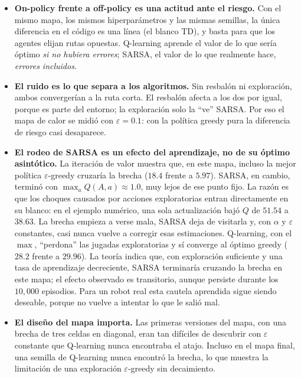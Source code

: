 \documentclass[11pt]{article}
\begin{document}
\begin{itemize}
    \item \textbf{On-policy frente a off-policy es una actitud ante el riesgo.}
    Con el mismo mapa, los mismos hiperparámetros y las mismas semillas, la
    única diferencia en el código es una línea (el blanco TD), y basta para que
    los agentes elijan rutas opuestas. Q-learning aprende el valor de lo que
    sería óptimo \emph{si no hubiera errores}; SARSA, el valor de lo que
    realmente hace, \emph{errores incluidos}.

    \item \textbf{El ruido es lo que separa a los algoritmos.} Sin resbalón ni
    exploración, ambos convergerían a la ruta corta. El resbalón afecta a los dos
    por igual, porque es parte del entorno; la exploración solo la ``ve'' SARSA.
    Por eso el mapa de calor se midió con $\varepsilon = 0.1$: con la política
    greedy pura la diferencia de riesgo casi desaparece.

    \item \textbf{El rodeo de SARSA es un efecto del aprendizaje, no de su
    óptimo asintótico.} La iteración de valor muestra que, en este mapa, incluso
    la mejor política $\varepsilon$-greedy cruzaría la brecha ($18.4$ frente a
    $5.97$). SARSA, en cambio, terminó con $\max_a Q(A,a) \approx 1.0$, muy
    lejos de ese punto fijo. La razón es que los choques causados por acciones
    exploratorias entran directamente en su blanco: en el ejemplo numérico, una
    sola actualización bajó $Q$ de $51.54$ a $38.63$. La brecha empieza a verse
    mala, SARSA deja de visitarla y, con $\alpha$ y $\varepsilon$ constantes, casi
    nunca vuelve a corregir esas estimaciones. Q-learning, con el $\max$,
    ``perdona'' las jugadas exploratorias y sí converge al óptimo greedy ($28.2$
    frente a $29.96$). La teoría indica que, con exploración suficiente y una
    tasa de aprendizaje decreciente, SARSA terminaría cruzando la brecha en este
    mapa; el efecto observado es transitorio, aunque persiste durante los
    $10{,}000$ episodios. Para un robot real esta cautela aprendida sigue siendo
    deseable, porque no vuelve a intentar lo que le salió mal.

    \item \textbf{El diseño del mapa importa.} Las primeras versiones del mapa,
    con una brecha de tres celdas en diagonal, eran tan difíciles de descubrir
    con $\varepsilon$ constante que Q-learning nunca encontraba el atajo. Incluso
    en el mapa final, una semilla de Q-learning nunca encontró la brecha, lo que
    muestra la limitación de una exploración $\varepsilon$-greedy sin
    decaimiento.


\end{itemize}
\end{document}

